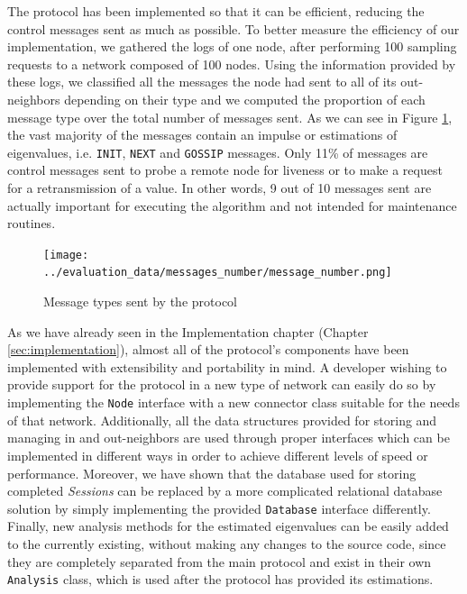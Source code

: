 \documentclass[a4paper,11pt,twoside]{report}
\newcommand{\classname}[1]{\texttt{#1}}
\begin{document}
The protocol has been implemented so that it can be efficient, reducing the control messages sent as much as possible. To better measure the efficiency of our implementation, we gathered the logs of one node, after performing 100 sampling requests to a network composed of 100 nodes. Using the information provided by these logs, we classified all the messages the node had sent to all of its out-neighbors depending on their type and we computed the proportion of each message type over the total number of messages sent. As we can see in Figure \ref{fig:messages_number}, the vast majority of the messages contain an impulse or estimations of eigenvalues, i.e. \classname{INIT}, \classname{NEXT} and \classname{GOSSIP} messages. Only 11\% of messages are control messages sent to probe a remote node for liveness or to make a request for a retransmission of a value. In other words, 9 out of 10 messages sent are actually important for executing the algorithm and not intended for maintenance routines.


\begin{figure} [H]
   \centering
    \texttt{[image: ../evaluation\_data/messages\_number/message\_number.png]}
     \caption{Message types sent by the protocol}
     \label{fig:messages_number}
\end{figure}

As we have already seen in the Implementation chapter (Chapter \ref{sec:implementation}), almost all of the protocol's components have been implemented with extensibility and portability in mind. A developer wishing to provide support for the protocol in a new type of network can easily do so by implementing the \classname{Node} interface with a new connector class suitable for the needs of that network. Additionally, all the data structures provided for storing and managing in and out-neighbors are used through proper interfaces which can be implemented in different ways in order to achieve different levels of speed or performance. Moreover, we have shown that the database used for storing completed \textit{Sessions} can be replaced by a more complicated relational database solution by simply implementing the provided \classname{Database} interface differently. Finally, new analysis methods for the estimated eigenvalues can be easily added to the currently existing, without making any changes to the source code, since they are completely separated from the main protocol and exist in their own \classname{Analysis} class, which is used after the protocol has provided its estimations.\\
\end{document}
